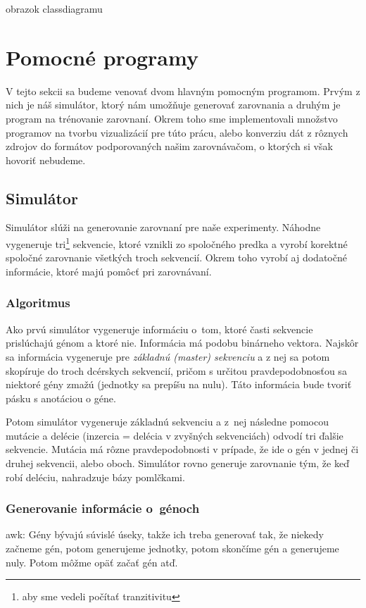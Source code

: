 \todo obrazok classdiagramu

\section{Pomocné programy}
V tejto sekcii sa budeme venovať dvom hlavným pomocným programom. Prvým z nich je náš simulátor, ktorý nám umožňuje generovať zarovnania a druhým je program na trénovanie zarovnaní. Okrem toho sme implementovali množstvo programov na tvorbu vizualizácií pre túto prácu, alebo konverziu dát z rôznych zdrojov do formátov podporovaných našim zarovnávačom, o ktorých si však hovoriť nebudeme.
\subsection{Simulátor}
\label{subsec:simulator}

Simulátor slúži na generovanie zarovnaní pre naše experimenty. Náhodne vygeneruje tri\footnote{aby sme vedeli počítať tranzitivitu} sekvencie, ktoré vznikli zo spoločného predka a vyrobí korektné spoločné zarovnanie všetkých troch sekvencií. Okrem toho vyrobí aj dodatočné informácie, ktoré majú pomôcť pri zarovnávaní.

\subsubsection{Algoritmus}
Ako prvú simulátor vygeneruje informáciu o~tom, ktoré časti sekvencie prislúchajú génom a ktoré nie. Informácia má podobu binárneho vektora.
Najskôr sa informácia vygeneruje pre \textit{základnú (master) sekvenciu} a z nej sa potom skopíruje do troch dcérskych sekvencií, pričom s určitou pravdepodobnosťou sa niektoré gény zmažú (jednotky sa prepíšu na nulu). Táto informácia bude tvoriť pásku s anotáciou o géne.

Potom simulátor vygeneruje základnú sekvenciu a z~nej následne pomocou mutácie a delécie (inzercia = delécia v zvyšných sekvenciách) odvodí tri ďalšie sekvencie. Mutácia má rôzne pravdepodobnosti v prípade, že ide o gén v jednej či druhej sekvencii, alebo oboch.
Simulátor rovno generuje zarovnanie tým, že keď robí deléciu, nahradzuje bázy pomlčkami.


\subsubsection{Generovanie informácie o~génoch}
\todo awk:
Gény bývajú súvislé úseky, takže ich treba generovať tak, že niekedy začneme gén, potom generujeme jednotky, potom skončíme gén a generujeme nuly. Potom môžme opäť začať gén atď.

